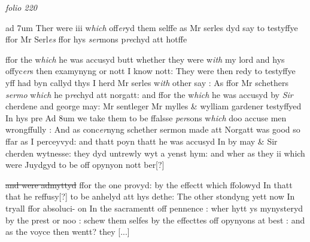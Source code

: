 \documentclass[12pt, a4paper]{book}
\begin{document}
\dotfill
					

\textit{folio 220}


ad 7um Ther were iii w\textit{hich} off\textit{er}yd them selffe as Mr serles dyd say
			 to testyffye ffor Mr Serl\textit{es} ffor hys \textit{ser}mons p\textit{re}chyd att hotffe
			
                ffor the w\textit{hich} he was accusyd butt whether they were w\textit{ith} my lord and hys offyc\textit{er}s then examynyng or nott I know nott: They were then redy to testyffye yff  had byn callyd thys I herd Mr serles w\textit{ith} other say : As ffor Mr schethers \textit{sermo
                     }
                      w\textit{hich} he p\textit{re}chyd att norgatt: and ffor the w\textit{hich} he was accusyd by \textit{Sir} cherdene and  george may: Mr sentleger Mr mylles \& wylliam gardener testyffyed In hys pre Ad 8um we take them to be ffalsse \textit{per}sons w\textit{hich} doo accuse men wrongffully : And as conc\textit{er}nyng schether sermon made att Norgatt was good so ffar as I perceyvyd: and thatt poyn
                               thatt he was accusyd In by may \& Sir cherden wytnesse: they dyd untrewly wyt a yenst hym: and wher as they ii which were Juydgyd to be off opynyon nott ber[?]
                                    
                                    \sout{and were admyttyd} ffor the one provyd: by the effectt which ffolowyd In thatt that he reffusy[?]
                                     to be anhelyd att hys dethe: The other stondyng yett now In tryall ffor absoluci- on In the sacramentt off pennence : wher hytt ys mynysteryd by the prest or noo : schew them selfes by the effecttes off opynyons at best : and as the voyce then wentt? they 
				[...]
			
\end{document}
